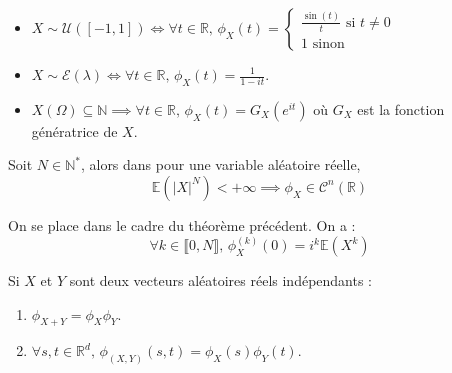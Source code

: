   \begin{example}
    \begin{itemize}
      \item $X \sim \mathcal{U}([-1, 1]) \iff \forall t \in \mathbb{R}, \, \phi_X(t) = \begin{cases}
        \frac{\sin(t)}{t} \text{ si } t \neq 0 \\
        1 \text{ sinon}
      \end{cases}$
      \item $X \sim \mathcal{E}(\lambda) \iff \forall t \in \mathbb{R}, \, \phi_X(t) = \frac{1}{1-it}$.
      \item $X(\Omega) \subseteq \mathbb{N} \implies \forall t \in \mathbb{R}, \, \phi_X(t) = G_X(e^{it})$ où $G_X$ est la fonction génératrice de $X$.
    \end{itemize}
  \end{example}

  \begin{theorem}
    Soit $N \in \mathbb{N}^*$, alors dans pour une variable aléatoire réelle,
    \[ \mathbb{E}(\vert X \vert^N) < +\infty \implies \phi_X \in \mathcal{C}^n(\mathbb{R}) \]
  \end{theorem}

  \begin{corollary}
    On se place dans le cadre du théorème précédent. On a :
    \[ \forall k \in \llbracket 0, N \rrbracket, \, \phi_X^{(k)} (0) = i^k \mathbb{E}(X^k) \]
  \end{corollary}

  \begin{theorem}
    Si $X$ et $Y$ sont deux vecteurs aléatoires réels indépendants :
    \begin{enumerate}[label=(\roman*)]
      \item $\phi_{X+Y} = \phi_X \phi_Y$.
      \item $\forall s, t \in \mathbb{R}^d, \, \phi_{(X,Y)}(s,t) = \phi_X(s) \phi_Y(t)$.
    \end{enumerate}
  \end{theorem}


